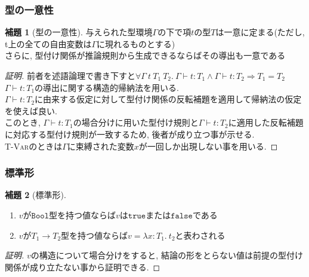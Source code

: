 \documentclass[dvipdfmx,cjk,xcolor=dvipsnames,envcountsect,notheorems,aspectratio=169]{beamer}
\theoremstyle{definition}
\newtheorem{lemma}{補題}
\newcommand{\BOOL}{\texttt{Bool}}
\newcommand{\TRUE}{\texttt{true}}
\newcommand{\FALSE}{\texttt{false}}
\begin{document}
\begin{frame}
  \frametitle{型の一意性}
  \renewcommand{\thelemma}{9.3.3}
  \begin{lemma}[型の一意性]
		与えられた型環境$\Gamma$の下で項$t$の型$T$は一意に定まる(ただし, t上の全ての自由変数は$\Gamma$に現れるものとする) \\
		さらに, 型付け関係が推論規則から生成できるならばその導出も一意である
  \end{lemma}
  \begin{proof}[証明]
		前者を述語論理で書き下すと$\forall \Gamma~t~T_1~T_2.~\Gamma \vdash t:T_1 \wedge \Gamma \vdash t : T_2 \Rightarrow T_1 = T_2$ \\
		$\Gamma \vdash t : T_1$の導出に関する構造的帰納法を用いる. \\
		$\Gamma \vdash t : T_2$に由来する仮定に対して型付け関係の反転補題を適用して帰納法の仮定を使えば良い. \\
		このとき, $\Gamma \vdash t : T_1$の場合分けに用いた型付け規則と$\Gamma \vdash t : T_2$に適用した反転補題に対応する型付け規則が一致するため, 後者が成り立つ事が示せる.\\
		\textsc{T-Var}のときは$\Gamma$に束縛された変数$x$が一回しか出現しない事を用いる.
  \end{proof}
\end{frame}

\begin{frame}
  \frametitle{標準形}
  \renewcommand{\thelemma}{9.3.4}
  \begin{lemma}[標準形]
		\begin{enumerate}
			\item $v$が$\BOOL$型を持つ値ならば$v$は$\TRUE$または$\FALSE$である
			\item $v$が$T_1 \to T_2$型を持つ値ならば$v=\lambda x:T_1.~t_2$と表わされる
		\end{enumerate}
  \end{lemma}
  \begin{proof}[証明]
		$v$の構造について場合分けをすると, 結論の形をとらない値は前提の型付け関係が成り立たない事から証明できる.
  \end{proof}
\end{frame}
\end{document}
